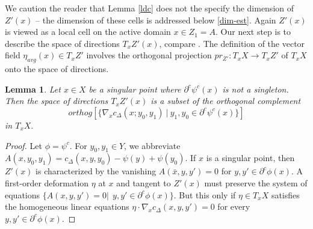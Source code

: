 \documentclass[12pt]{amsart}
\newtheorem{lem}{Lemma}
\newtheorem{prop}{Proposition}
\theoremstyle{definition}
\theoremstyle{remark}
\newcommand{\del}{\partial}
\newcommand{\cd}{c_\Delta}
\begin{document}












We caution the reader that Lemma \ref{ldc} does not the specify the dimension of $Z'(x)$ -- the dimension of these cells is addressed below \ref{dim-est}. Again $Z'(x)$ is viewed as a local cell on the active domain $x\in Z_1=A$. Our next step is to describe the space of directions $T_x Z'(x)$, compare \cite[Def.10.4.6, pp.257]{Vil1}. The definition of the vector field $\eta_{avg}(x) \in T_x Z'$ involves the orthogonal projection $pr_{Z'}:T_x X \to T_x Z'$ of $T_xX$ onto the space of directions. 


\begin{lem}\label{orthog}
Let $x\in X$ be a singular point where $\del^c \psi^c(x)$ is not a singleton.  Then the space of directions $T_x Z'(x)$  is a subset of the orthogonal complement  $$orthog[\{\nabla_x \cd(x; y_0, y_1)~ |~ y_1,y_0 \in \del^c \psi^c (x) \}]$$ in $ T_x X.$ 
\end{lem}
\begin{proof}
Let $\phi=\psi^c$. For $y_0, y_1 \in Y$, we abbreviate $A(x,y_0,y_1)=\cd(x,y,y_0)-\psi(y)+\psi(y_0)$. If $x$ is a singular point, then $Z'(x)$ is characterized by the vanishing $A(\bar{x}, y, y')=0$ for $y,y'\in \del^c \phi(x)$. A first-order deformation $\eta$ at $x$ and tangent to $Z'(x)$ must preserve the system of equations $\{A(x,y,y')=0 | ~~ y, y' \in \del^c \phi (x)\}$. But this only if $\eta \in T_x X$ satisfies the homogeneous linear equations $\eta \cdot \nabla_x \cd(x, y, y')=0$ for every $y, y'\in \del^c \phi(x)$. 
\end{proof}
\end{document}
